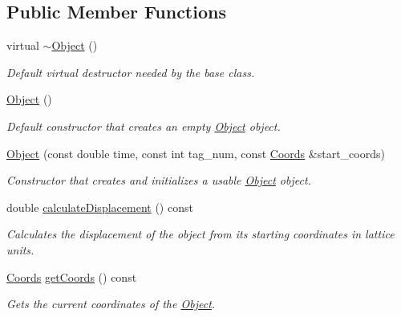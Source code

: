 \subsection*{Public Member Functions}
\begin{DoxyCompactItemize}
\item 
\mbox{\label{class_object_ae8f5483f459e46687bd01e6f9977afd3}} 
virtual \hyperlink{class_object_ae8f5483f459e46687bd01e6f9977afd3}{$\sim$\+Object} ()
\begin{DoxyCompactList}\small\item\em Default virtual destructor needed by the base class. \end{DoxyCompactList}\item 
\mbox{\label{class_object_a40860402e64d8008fb42329df7097cdb}} 
\hyperlink{class_object_a40860402e64d8008fb42329df7097cdb}{Object} ()
\begin{DoxyCompactList}\small\item\em Default constructor that creates an empty \hyperlink{class_object}{Object} object. \end{DoxyCompactList}\item 
\hyperlink{class_object_aff050a622272cc7667251c7315f09fd7}{Object} (const double time, const int tag\+\_\+num, const \hyperlink{struct_coords}{Coords} \&start\+\_\+coords)
\begin{DoxyCompactList}\small\item\em Constructor that creates and initializes a usable \hyperlink{class_object}{Object} object. \end{DoxyCompactList}\item 
double \hyperlink{class_object_a02643ea0804dec3e43f60c788855c03b}{calculate\+Displacement} () const
\begin{DoxyCompactList}\small\item\em Calculates the displacement of the object from its starting coordinates in lattice units. \end{DoxyCompactList}\item 
\hyperlink{struct_coords}{Coords} \hyperlink{class_object_a08df08943dc634609fa69b356a37d73f}{get\+Coords} () const
\begin{DoxyCompactList}\small\item\em Gets the current coordinates of the \hyperlink{class_object}{Object}. \end{DoxyCompactList}\item 

\end{DoxyCompactItemize}

